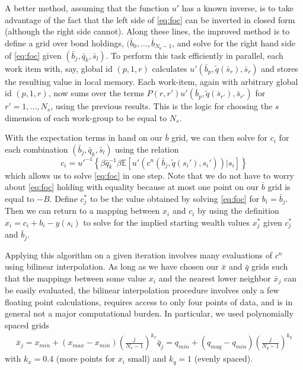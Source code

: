 \documentclass[a4paper,12pt]{article}
\newcommand{\E}{\mathbb{E}}
\numberwithin{equation}{section}
\theoremstyle{definition}
\begin{document}
A better method, assuming that the function $u'$ has a known inverse,
is to take advantage of the fact that the left side of \eqref{eq:foc} can
be inverted in closed form (although the right side cannot). Along
these lines, the improved method is to define a grid over bond
holdings, $(\bar{b}_0, \ldots, \bar{b}_{N_b-1}$, and solve for the
right hand side of \eqref{eq:foc} given $(\bar{b}_j, \bar{q}_k,
\bar{s}_l)$. To perform this task efficiently in parallel, each work
item with, say, global id $(p, 1, r)$ calculates $u'(\bar{b}_p,
\tilde{q}(\bar{s}_r), \bar{s}_r)$ and stores the resulting value in
local memory. Each work-item, again with arbitrary global id $(p, 1,
r)$, now sums over the terms $P(r, r') u'(\bar{b}_p,
\tilde{q}(\bar{s}_{r'}), \bar{s}_{r'})$ for $r' = 1, \ldots, N_s$,
using the previous results. This is the logic for choosing the $s$
dimension of each work-group to be equal to $N_s$.

With the expectation terms in hand on our $\bar{b}$ grid, we can then
solve for $c_i$ for each combination $(\bar{b}_j, \bar{q}_k,
\bar{s}_l)$ using the relation
\begin{equation*}
  c_i = u'^{-1} \left\{ \beta \bar{q}_k^{-1} \beta \E \left[ u'(c^n(\bar{b}_j, \tilde{q}(s_i'), s_i')) \Bigr| s_i \right] \right\}
\end{equation*}
which allows us to solve \eqref{eq:foc} in one step. Note that we do not
have to worry about \eqref{eq:foc} holding with equality because at most
one point on our $\bar{b}$ grid is equal to $-B$. Define $c_j^*$ to be
the value obtained by solving \eqref{eq:foc} for $b_i = \bar{b}_j$. Then
we can return to a mapping between $x_i$ and $c_i$ by using the
definition $x_i = c_i + b_i - y(s_i)$ to solve for the implied
starting wealth values $x_j^*$ given $c_j^*$ and $\bar{b}_j$.

Applying this algorithm on a given iteration involves many evaluations
of $c^n$ using bilinear interpolation. As long as we have chosen our
$\bar{x}$ and $\bar{q}$ grids such that the mappings between some
value $x_i$ and the nearest lower neighbor $\bar{x}_j$ can be easily
evaluated, the bilinear interpolation procedure involves only a few
floating point calculations, requires access to only four points of
data, and is in general not a major computational burden. In
particular, we used polynomially spaced grids
\begin{align*}
  \bar{x}_j = x_{min} + (x_{max} - x_{min}) \left( \frac{j}{N_x-1} \right)^{k_x}
  \bar{q}_j = q_{min} + (q_{maq} - q_{min}) \left( \frac{j}{N_q-1} \right)^{k_q}
\end{align*}
with $k_x = 0.4$ (more points for $x_i$ small) and $k_q = 1$ (evenly
spaced).
\end{document}
